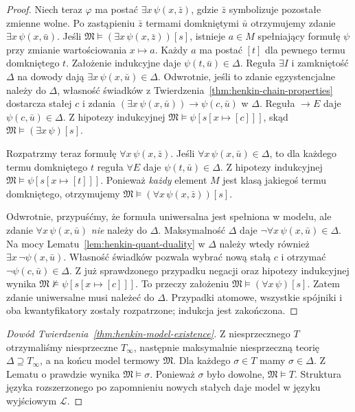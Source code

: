 \begin{proof}
Niech teraz $\varphi$ ma postać $\exists x\,\psi(x,\bar z)$, gdzie $\bar z$ symbolizuje pozostałe zmienne wolne. Po zastąpieniu $\bar z$ termami domkniętymi $\bar u$ otrzymujemy zdanie $\exists x\,\psi(x,\bar u)$. Jeśli $\mathfrak M\models(\exists x\,\psi(x,\bar z))[s]$, istnieje $a\in M$ spełniający formułę $\psi$ przy zmianie wartościowania $x\mapsto a$. Każdy $a$ ma postać $[t]$ dla pewnego termu domkniętego $t$. Założenie indukcyjne daje $\psi(t,\bar u)\in\Delta$. Reguła $\exists I$ i zamkniętość $\Delta$ na dowody dają $\exists x\,\psi(x,\bar u)\in\Delta$. Odwrotnie, jeśli to zdanie egzystencjalne należy do $\Delta$, własność świadków z Twierdzenia~\ref{thm:henkin-chain-properties} dostarcza stałej $c$ i zdania $(\exists x\,\psi(x,\bar u))\to\psi(c,\bar u)$ w $\Delta$. Reguła $\to E$ daje $\psi(c,\bar u)\in\Delta$. Z hipotezy indukcyjnej $\mathfrak M\models\psi[s[x\mapsto[c]]]$, skąd $\mathfrak M\models(\exists x\,\psi)[s]$.

Rozpatrzmy teraz formułę $\forall x\,\psi(x,\bar z)$.
Jeśli $\forall x\,\psi(x,\bar u)\in\Delta$, to dla
każdego termu domkniętego $t$ reguła $\forall E$
daje $\psi(t,\bar u)\in\Delta$.
Z hipotezy indukcyjnej $\mathfrak M\models\psi[s[x\mapsto[t]]]$.
Ponieważ \emph{każdy} element $M$ jest klasą jakiegoś
termu domkniętego, otrzymujemy
$\mathfrak M\models(\forall x\,\psi(x,\bar z))[s]$.

Odwrotnie, przypuśćmy, że formuła uniwersalna jest
spełniona w modelu, ale zdanie
$\forall x\,\psi(x,\bar u)$ \emph{nie} należy do $\Delta$.
Maksymalność $\Delta$ daje
$\neg\forall x\,\psi(x,\bar u)\in\Delta$.
Na mocy Lematu~\ref{lem:henkin-quant-duality}
w $\Delta$ należy wtedy również
$\exists x\,\neg\psi(x,\bar u)$.
Własność świadków pozwala wybrać nową stałą $c$
i otrzymać $\neg\psi(c,\bar u)\in\Delta$.
Z już sprawdzonego przypadku negacji oraz hipotezy
indukcyjnej wynika
$\mathfrak M\not\models\psi[s[x\mapsto[c]]]$.
To przeczy założeniu
$\mathfrak M\models(\forall x\,\psi)[s]$.
Zatem zdanie uniwersalne musi należeć do $\Delta$.
Przypadki atomowe, wszystkie spójniki i oba kwantyfikatory
zostały rozpatrzone; indukcja jest zakończona.
\end{proof}

\begin{proof}[Dowód Twierdzenia~\ref{thm:henkin-model-existence}]
Z niesprzecznego $T$ otrzymaliśmy niesprzeczne $T_{\infty}$, następnie maksymalnie niesprzeczną teorię $\Delta\supseteq T_{\infty}$, a na końcu model termowy $\mathfrak M$. Dla każdego $\sigma\in T$ mamy $\sigma\in\Delta$. Z Lematu o prawdzie wynika $\mathfrak M\models\sigma$. Ponieważ $\sigma$ było dowolne, $\mathfrak M\models T$. Struktura języka rozszerzonego po zapomnieniu nowych stałych daje model w języku wyjściowym $\mathcal L$.
\end{proof}

